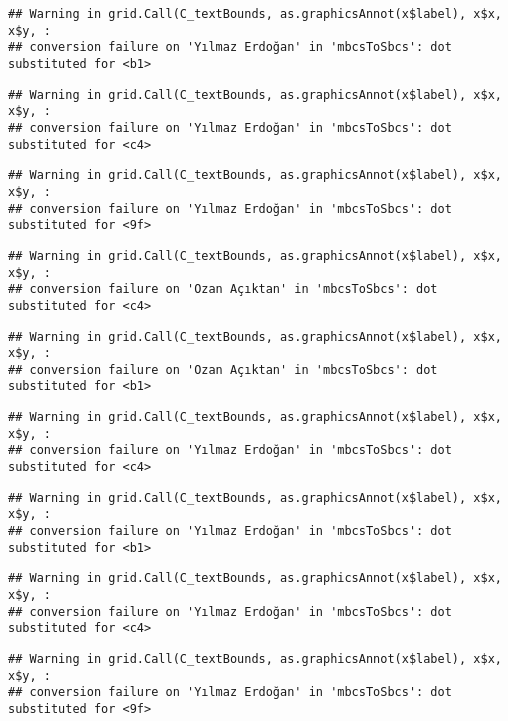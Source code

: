 \documentclass[
]{article}
\begin{document}
\begin{verbatim}
## Warning in grid.Call(C_textBounds, as.graphicsAnnot(x$label), x$x, x$y, :
## conversion failure on 'Yılmaz Erdoğan' in 'mbcsToSbcs': dot substituted for <b1>
\end{verbatim}

\begin{verbatim}
## Warning in grid.Call(C_textBounds, as.graphicsAnnot(x$label), x$x, x$y, :
## conversion failure on 'Yılmaz Erdoğan' in 'mbcsToSbcs': dot substituted for <c4>
\end{verbatim}

\begin{verbatim}
## Warning in grid.Call(C_textBounds, as.graphicsAnnot(x$label), x$x, x$y, :
## conversion failure on 'Yılmaz Erdoğan' in 'mbcsToSbcs': dot substituted for <9f>
\end{verbatim}

\begin{verbatim}
## Warning in grid.Call(C_textBounds, as.graphicsAnnot(x$label), x$x, x$y, :
## conversion failure on 'Ozan Açıktan' in 'mbcsToSbcs': dot substituted for <c4>
\end{verbatim}

\begin{verbatim}
## Warning in grid.Call(C_textBounds, as.graphicsAnnot(x$label), x$x, x$y, :
## conversion failure on 'Ozan Açıktan' in 'mbcsToSbcs': dot substituted for <b1>
\end{verbatim}

\begin{verbatim}
## Warning in grid.Call(C_textBounds, as.graphicsAnnot(x$label), x$x, x$y, :
## conversion failure on 'Yılmaz Erdoğan' in 'mbcsToSbcs': dot substituted for <c4>
\end{verbatim}

\begin{verbatim}
## Warning in grid.Call(C_textBounds, as.graphicsAnnot(x$label), x$x, x$y, :
## conversion failure on 'Yılmaz Erdoğan' in 'mbcsToSbcs': dot substituted for <b1>
\end{verbatim}

\begin{verbatim}
## Warning in grid.Call(C_textBounds, as.graphicsAnnot(x$label), x$x, x$y, :
## conversion failure on 'Yılmaz Erdoğan' in 'mbcsToSbcs': dot substituted for <c4>
\end{verbatim}

\begin{verbatim}
## Warning in grid.Call(C_textBounds, as.graphicsAnnot(x$label), x$x, x$y, :
## conversion failure on 'Yılmaz Erdoğan' in 'mbcsToSbcs': dot substituted for <9f>
\end{verbatim}
\end{document}
